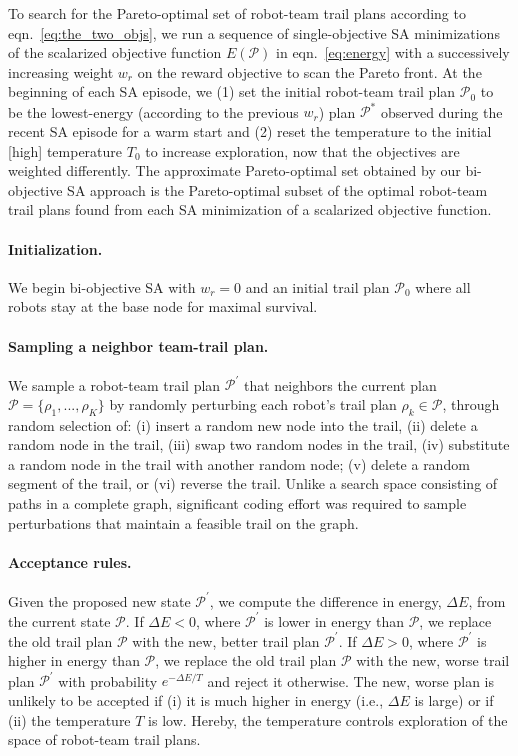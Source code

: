 \documentclass[fleqn,10pt,lineno]{wlpeerj}
\begin{document}
To search for the Pareto-optimal set of robot-team trail plans according to eqn.~\ref{eq:the_two_objs}, we run a sequence of single-objective SA minimizations of the scalarized objective function $E(\mathcal{P})$ in eqn.~\ref{eq:energy} with a successively increasing weight $w_r$ on the reward objective to scan the Pareto front.
At the beginning of each SA episode, we 
(1) set the initial robot-team trail plan $\mathcal{P}_0$ to be the lowest-energy (according to the previous $w_r$) plan $\mathcal{P}^*$ observed during the recent SA episode for a warm start and
(2) reset the temperature to the initial [high] temperature $T_0$ to increase exploration, now that the objectives are weighted differently.
The approximate Pareto-optimal set obtained by our bi-objective SA approach is the Pareto-optimal subset of the optimal robot-team trail plans found from each SA minimization of a scalarized objective function.

\paragraph{Initialization.} We begin bi-objective SA with $w_r=0$ and an initial trail plan $\mathcal{P}_0$ where all robots stay at the base node for maximal survival.

\paragraph{Sampling a neighbor team-trail plan.}
We sample a robot-team trail plan $\mathcal{P}^\prime$ that neighbors the current plan $\mathcal{P}=\{\rho_1, ..., \rho_K\}$ by randomly perturbing each robot's trail plan $\rho_k\in \mathcal{P}$, through random selection of: (i) insert a random new node into the trail, (ii) delete a random node in the trail, (iii) swap two random nodes in the trail, (iv) substitute a random node in the trail with another random node; (v) delete a random segment of the trail, or (vi) reverse the trail. 
Unlike a search space consisting of paths in a complete graph, significant coding effort was required to sample perturbations that maintain a feasible trail on the graph. 

\paragraph{Acceptance rules.}
Given the proposed new state $\mathcal{P}^\prime$, 
we compute the difference in energy, $\Delta E$, from the current state $\mathcal{P}$.
If $\Delta E < 0$, where $\mathcal{P}^\prime$ is lower in energy than $\mathcal{P}$, we replace the old trail plan $\mathcal{P}$ with the new, better trail plan $\mathcal{P}^\prime$. 
If $\Delta E > 0$, where $\mathcal{P}^\prime$ is higher in energy than $\mathcal{P}$, we replace the old trail plan $\mathcal{P}$ with the new, worse trail plan $\mathcal{P}^\prime$ with probability $e^{-\Delta E / T}$ and reject it otherwise. The new, worse plan is unlikely to be accepted if (i) it is much higher in energy (i.e., $\Delta E$ is large) or if (ii) the temperature $T$ is low. Hereby, the temperature controls exploration of the space of robot-team trail plans. 
\end{document}
